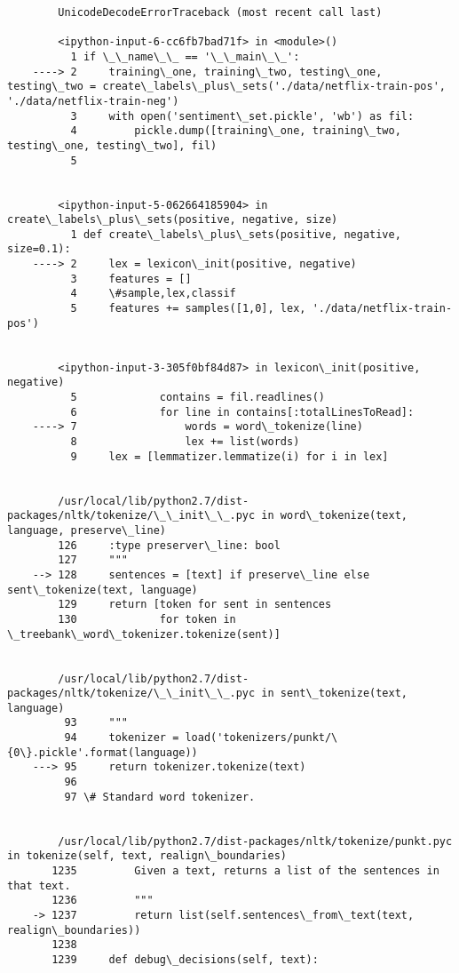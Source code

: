 \documentclass[11pt]{article}
\begin{document}
    \begin{Verbatim}[commandchars=\\\{\}]

        

        UnicodeDecodeErrorTraceback (most recent call last)

        <ipython-input-6-cc6fb7bad71f> in <module>()
          1 if \_\_name\_\_ == '\_\_main\_\_':
    ----> 2     training\_one, training\_two, testing\_one, testing\_two = create\_labels\_plus\_sets('./data/netflix-train-pos', './data/netflix-train-neg')
          3     with open('sentiment\_set.pickle', 'wb') as fil:
          4         pickle.dump([training\_one, training\_two, testing\_one, testing\_two], fil)
          5 


        <ipython-input-5-062664185904> in create\_labels\_plus\_sets(positive, negative, size)
          1 def create\_labels\_plus\_sets(positive, negative, size=0.1):
    ----> 2     lex = lexicon\_init(positive, negative)
          3     features = []
          4     \#sample,lex,classif
          5     features += samples([1,0], lex, './data/netflix-train-pos')


        <ipython-input-3-305f0bf84d87> in lexicon\_init(positive, negative)
          5             contains = fil.readlines()
          6             for line in contains[:totalLinesToRead]:
    ----> 7                 words = word\_tokenize(line)
          8                 lex += list(words)
          9     lex = [lemmatizer.lemmatize(i) for i in lex]


        /usr/local/lib/python2.7/dist-packages/nltk/tokenize/\_\_init\_\_.pyc in word\_tokenize(text, language, preserve\_line)
        126     :type preserver\_line: bool
        127     """
    --> 128     sentences = [text] if preserve\_line else sent\_tokenize(text, language)
        129     return [token for sent in sentences
        130             for token in \_treebank\_word\_tokenizer.tokenize(sent)]


        /usr/local/lib/python2.7/dist-packages/nltk/tokenize/\_\_init\_\_.pyc in sent\_tokenize(text, language)
         93     """
         94     tokenizer = load('tokenizers/punkt/\{0\}.pickle'.format(language))
    ---> 95     return tokenizer.tokenize(text)
         96 
         97 \# Standard word tokenizer.


        /usr/local/lib/python2.7/dist-packages/nltk/tokenize/punkt.pyc in tokenize(self, text, realign\_boundaries)
       1235         Given a text, returns a list of the sentences in that text.
       1236         """
    -> 1237         return list(self.sentences\_from\_text(text, realign\_boundaries))
       1238 
       1239     def debug\_decisions(self, text):



\end{Verbatim}
\end{document}
